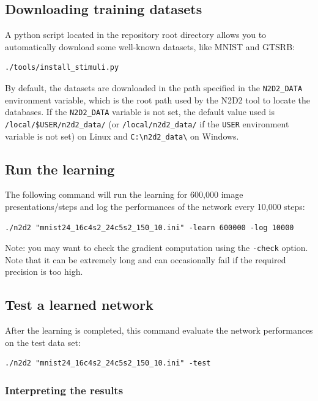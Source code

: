 \documentclass[a4paper,11pt,oneside]{article}
\begin{document}
\subsection{Downloading training datasets}

A python script located in the repository root directory allows you to
 automatically download some well-known datasets,
like MNIST and GTSRB:
\begin{lstlisting}
./tools/install_stimuli.py
\end{lstlisting}

By default, the datasets are downloaded in the path specified in the
 \lstinline!N2D2_DATA! environment variable, which is the root path used by the
 N2D2 tool to locate the databases. If the \lstinline!N2D2_DATA! variable is
  not set, the default value used is {\tt{}/local/\$USER/n2d2\_data/}
  (or {\tt{}/local/n2d2\_data/} if the \lstinline!USER! environment variable
   is not set) on Linux and {\tt{}C:\textbackslash{}n2d2\_data\textbackslash{}}
    on Windows.


\subsection{Run the learning}

The following command will run the learning for 600,000 image
presentations/steps and log the performances of the network every 10,000 steps:
\begin{lstlisting}
./n2d2 "mnist24_16c4s2_24c5s2_150_10.ini" -learn 600000 -log 10000
\end{lstlisting}

Note: you may want to check the gradient computation using the
 \lstinline!-check! option. Note that it can be extremely long and can
occasionally fail if the required precision is too high.

\subsection{Test a learned network}

After the learning is completed, this command evaluate the network performances
 on the test data set:
\begin{lstlisting}
./n2d2 "mnist24_16c4s2_24c5s2_150_10.ini" -test
\end{lstlisting}


\subsubsection{Interpreting the results}
\end{document}
